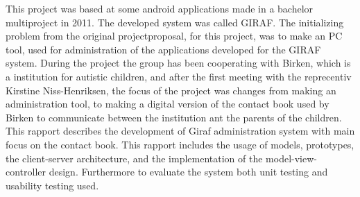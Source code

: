

This project was based at some android applications made in a bachelor multiproject in 2011. The developed system was called GIRAF. The initializing problem from the original projectproposal, for this project, was to make an PC tool, used for administration of the applications developed for the GIRAF system. During the project the group has been cooperating with Birken, which is a institution for autistic children, and after the first meeting with the reprecentiv Kirstine Niss-Henriksen, the focus of the project was changes from making an administration tool, to making a digital version of the contact book used by Birken to communicate between the institution ant the parents of the children.
This rapport describes the development of Giraf administration system with main focus on the contact book. This rapport includes the usage of models, prototypes, the client-server architecture, and the implementation of the model-view-controller design. Furthermore to evaluate the system both unit testing and usability testing used. 